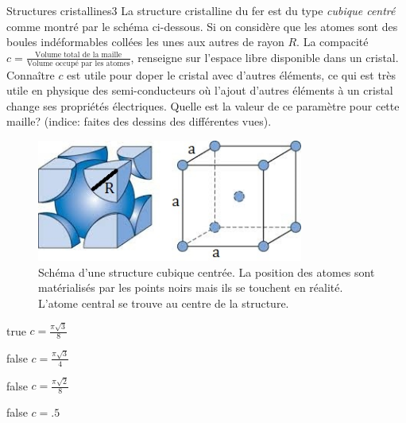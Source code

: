         \begin{question}{31}{Structures cristallines}{3}{}
            La structure cristalline du fer est du type \emph{cubique centré} comme montré par le schéma ci-dessous. Si on considère que les atomes sont des boules indéformables collées les unes aux autres de rayon $R$. La compacité $c = \frac{\text{Volume total de la maille}}{\text{Volume occupé par les atomes}}$, renseigne sur l'espace libre disponible dans un cristal. Connaître $c$ est utile pour doper le cristal avec d'autres éléments, ce qui est très utile en physique des semi-conducteurs où l'ajout d'autres éléments à un cristal change ses propriétés électriques. Quelle est la valeur de ce paramètre pour cette maille? (indice: faites des dessins des différentes vues).
            \begin{figure}
                \centering
                \includegraphics[height = 4cm]{Antoine/Figures_Antoine/BCC.png}
                \caption{Schéma d'une structure cubique centrée. La position des atomes sont matérialisés par les points noirs mais ils se touchent en réalité. L'atome central se trouve au centre de la structure.}
            \end{figure}
        \end{question}
        \begin{reponses} 
            \item[true] $c = \frac{\pi\sqrt{3}}{8}$
            \item[false] $c = \frac{\pi\sqrt{3}}{4}$
            \item[false] $c = \frac{\pi\sqrt{2}}{8}$
    	    \item[false] $c = \num{.5}$
        \end{reponses}
